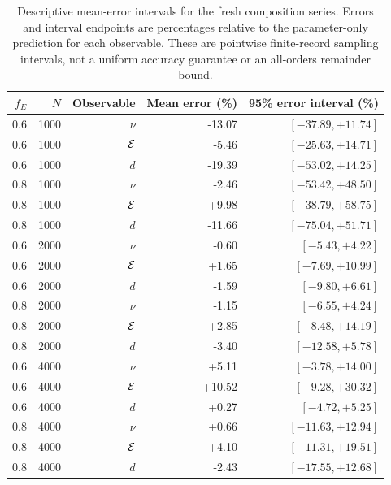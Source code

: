 \begin{table}[htp]
\centering
\caption{Descriptive mean-error intervals for the fresh composition series.
Errors and interval endpoints are percentages relative to the parameter-only
prediction for each observable. These are pointwise finite-record sampling
intervals, not a uniform accuracy guarantee or an all-orders remainder bound.}
\label{tab:ingredient_intervals}
\begin{tabular}{rrrrr}
\toprule
$f_E$&$N$&Observable&Mean error (\%)&95\% error interval (\%)\\
\midrule
0.6&1000&$\nu$&-13.07&$[-37.89,+11.74]$\\
0.6&1000&$\mathcal E$&-5.46&$[-25.63,+14.71]$\\
0.6&1000&$d$&-19.39&$[-53.02,+14.25]$\\
0.8&1000&$\nu$&-2.46&$[-53.42,+48.50]$\\
0.8&1000&$\mathcal E$&+9.98&$[-38.79,+58.75]$\\
0.8&1000&$d$&-11.66&$[-75.04,+51.71]$\\
0.6&2000&$\nu$&-0.60&$[-5.43,+4.22]$\\
0.6&2000&$\mathcal E$&+1.65&$[-7.69,+10.99]$\\
0.6&2000&$d$&-1.59&$[-9.80,+6.61]$\\
0.8&2000&$\nu$&-1.15&$[-6.55,+4.24]$\\
0.8&2000&$\mathcal E$&+2.85&$[-8.48,+14.19]$\\
0.8&2000&$d$&-3.40&$[-12.58,+5.78]$\\
0.6&4000&$\nu$&+5.11&$[-3.78,+14.00]$\\
0.6&4000&$\mathcal E$&+10.52&$[-9.28,+30.32]$\\
0.6&4000&$d$&+0.27&$[-4.72,+5.25]$\\
0.8&4000&$\nu$&+0.66&$[-11.63,+12.94]$\\
0.8&4000&$\mathcal E$&+4.10&$[-11.31,+19.51]$\\
0.8&4000&$d$&-2.43&$[-17.55,+12.68]$\\
\bottomrule
\end{tabular}
\end{table}
